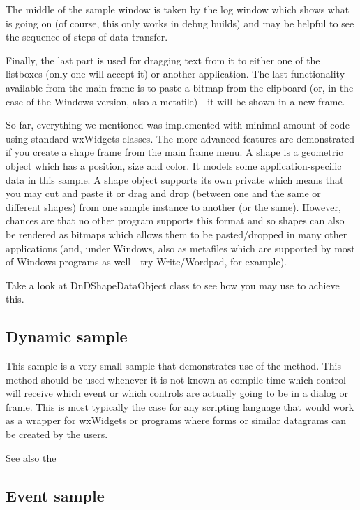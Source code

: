 The middle of the sample window is taken by the log window which shows what is
going on (of course, this only works in debug builds) and may be helpful to see
the sequence of steps of data transfer.

Finally, the last part is used for dragging text from it to either one of the
listboxes (only one will accept it) or another application. The last
functionality available from the main frame is to paste a bitmap from the
clipboard (or, in the case of the Windows version, also a metafile) - it will be
shown in a new frame.

So far, everything we mentioned was implemented with minimal amount of code
using standard wxWidgets classes. The more advanced features are demonstrated
if you create a shape frame from the main frame menu. A shape is a geometric
object which has a position, size and color. It models some
application-specific data in this sample. A shape object supports its own
private  which means that you may cut and
paste it or drag and drop (between one and the same or different shapes) from
one sample instance to another (or the same). However, chances are that no
other program supports this format and so shapes can also be rendered as
bitmaps which allows them to be pasted/dropped in many other applications
(and, under Windows, also as metafiles which are supported by most of Windows
programs as well - try Write/Wordpad, for example).

Take a look at DnDShapeDataObject class to see how you may use
 to achieve this.


\subsection{Dynamic sample}\label{sampledynamic}

This sample is a very small sample that demonstrates use of the
 method. This method
should be used whenever it is not known at compile time which control
will receive which event or which controls are actually going to be in
a dialog or frame. This is most typically the case for any scripting
language that would work as a wrapper for wxWidgets or programs where
forms or similar datagrams can be created by the users.

See also the 


\subsection{Event sample}\label{sampleevent}

